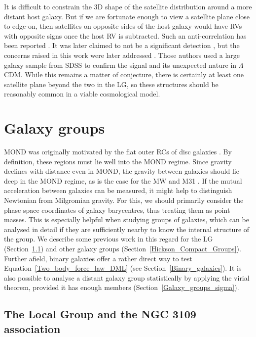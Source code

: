 \documentclass[fleqn,usenatbib,useAMS,onecolumn]{mnras} %
\begin{document}
It is difficult to constrain the 3D shape of the satellite distribution around a more distant host galaxy. But if we are fortunate enough to view a satellite plane close to edge-on, then satellites on opposite sides of the host galaxy would have RVs with opposite signs once the host RV is subtracted. Such an anti-correlation has been reported \citep{Ibata_2014_velocity_anti_correlation}. It was later claimed to not be a significant detection \citep{Cautun_2015_beyond_LG}, but the concerns raised in this work were later addressed \citep{Ibata_2015}. Those authors used a large galaxy sample from SDSS to confirm the signal and its unexpected nature in $\Lambda$CDM. While this remains a matter of conjecture, there is certainly at least one satellite plane beyond the two in the LG, so these structures should be reasonably common in a viable cosmological model.





\section{Galaxy groups}
\label{Galaxy_groups}

MOND was originally motivated by the flat outer RCs of disc galaxies \citep{Milgrom_1983}. By definition, these regions must lie well into the MOND regime. Since gravity declines with distance even in MOND, the gravity between galaxies should lie deep in the MOND regime, as is the case for the MW and M31 \citep{Banik_Ryan_2018}. If the mutual acceleration between galaxies can be measured, it might help to distinguish Newtonian from Milgromian gravity. For this, we should primarily consider the phase space coordinates of galaxy barycentres, thus treating them as point masses. This is especially helpful when studying groups of galaxies, which can be analysed in detail if they are sufficiently nearby to know the internal structure of the group. We describe some previous work in this regard for the LG (Section~\ref{Local_Group}) and other galaxy groups (Section~\ref{Hickson_Compact_Groups}). Further afield, binary galaxies offer a rather direct way to test Equation~\ref{Two_body_force_law_DML} (see Section~\ref{Binary_galaxies}). It is also possible to analyse a distant galaxy group statistically by applying the virial theorem, provided it has enough members (Section~\ref{Galaxy_groups_sigma}).



\subsection{The Local Group and the NGC 3109 association}
\label{Local_Group}
\end{document}
